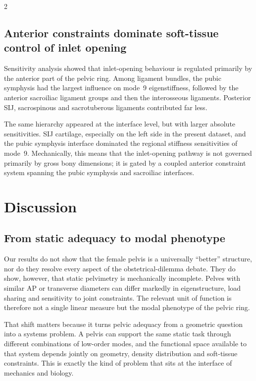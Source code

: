 \documentclass[openacc]{rsproca_new}
\begin{document}
\begin{multicols}{2}
\subsection{Anterior constraints dominate soft-tissue control of inlet opening}

Sensitivity analysis showed that inlet-opening behaviour is regulated primarily by the anterior part of the pelvic ring. Among ligament bundles, the pubic symphysis had the largest influence on mode~9 eigenstiffness, followed by the anterior sacroiliac ligament groups and then the interosseous ligaments. Posterior SIJ, sacrospinous and sacrotuberous ligaments contributed far less.

The same hierarchy appeared at the interface level, but with larger absolute sensitivities. SIJ cartilage, especially on the left side in the present dataset, and the pubic symphysis interface dominated the regional stiffness sensitivities of mode~9. Mechanically, this means that the inlet-opening pathway is not governed primarily by gross bony dimensions; it is gated by a coupled anterior constraint system spanning the pubic symphysis and sacroiliac interfaces.

\section{Discussion}

\subsection{From static adequacy to modal phenotype}

Our results do not show that the female pelvis is a universally ``better'' structure, nor do they resolve every aspect of the obstetrical-dilemma debate. They do show, however, that static pelvimetry is mechanically incomplete. Pelves with similar AP or transverse diameters can differ markedly in eigenstructure, load sharing and sensitivity to joint constraints. The relevant unit of function is therefore not a single linear measure but the modal phenotype of the pelvic ring.

That shift matters because it turns pelvic adequacy from a geometric question into a systems problem. A pelvis can support the same static task through different combinations of low-order modes, and the functional space available to that system depends jointly on geometry, density distribution and soft-tissue constraints. This is exactly the kind of problem that sits at the interface of mechanics and biology.


\end{multicols}
\end{document}
